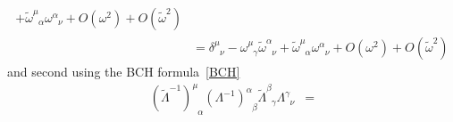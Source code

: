 \begin{equation*}
\begin{aligned}
+ \tilde \omega^{\mu}_{\phantom \mu \alpha} \omega^{\alpha}_{\phantom \alpha \nu} + O(\omega^2) + O(\tilde \omega^2) \\ & = \delta^{\mu}_{\phantom \mu \nu} - \omega^{\mu}_{\phantom \mu \gamma} \tilde \omega^{\alpha}_{\phantom \alpha \nu} + \tilde \omega^{\mu}_{\phantom \mu \alpha} \omega^{\alpha}_{\phantom \alpha \nu} + O(\omega^2) + O(\tilde \omega^2)
    \end{aligned}
    \end{equation*}
    and second using the BCH formula~\eqref{BCH}
    \begin{equation*}
    \begin{aligned}
        (\tilde \Lambda^{-1})^{\mu}_{\phantom \mu \alpha} (\Lambda^{-1})^{\alpha}_{\phantom \alpha \beta} \tilde \Lambda^{\beta}_{\phantom \beta \gamma} \Lambda^{\gamma}_{\phantom \gamma \nu} & = 
    \end{aligned}
    \end{equation*}
